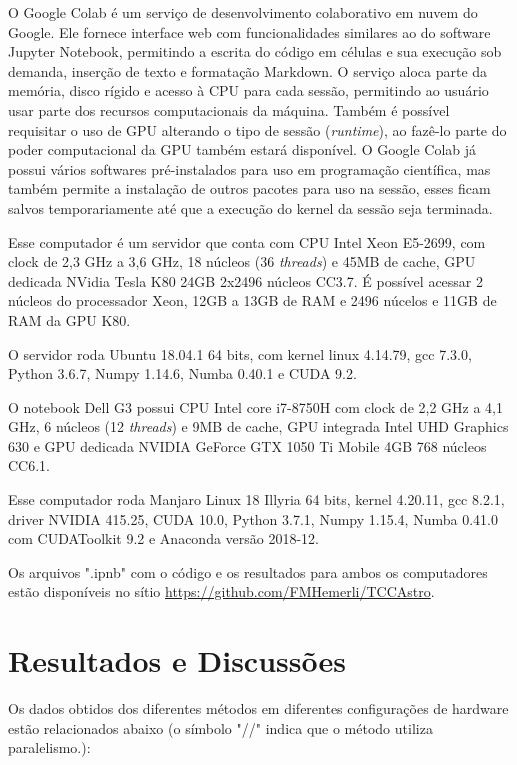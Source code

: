 \documentclass[
	12pt,				%
	a4paper,			%
	english,			%
	openright,				%
	brazil,				%
	oneside]{abntex2}
\begin{document}
	O Google Colab é um serviço de desenvolvimento colaborativo em nuvem do Google. Ele fornece interface web com funcionalidades similares ao do software Jupyter Notebook, permitindo a escrita do código em células e sua execução sob demanda, inserção de texto e formatação Markdown. O serviço aloca parte da memória, disco rígido e acesso à CPU para cada sessão, permitindo ao usuário usar parte dos recursos computacionais da máquina. Também é possível requisitar o uso de GPU alterando o tipo de sessão (\textit{runtime}), ao fazê-lo parte do poder computacional da GPU também estará disponível. O Google Colab já possui vários softwares pré-instalados para uso em programação científica, mas também permite a instalação de outros pacotes para uso na sessão, esses ficam salvos temporariamente até que a execução do kernel da sessão seja terminada.
	
	Esse computador é um servidor que conta com CPU Intel Xeon E5-2699, com clock de 2,3 GHz a 3,6 GHz, 18 núcleos (36 \textit{threads}) e 45MB de cache, GPU dedicada NVidia Tesla K80 24GB 2x2496 núcleos CC3.7. É possível acessar 2 núcleos do processador Xeon, 12GB a 13GB de RAM e 2496 núcelos e 11GB de RAM da GPU K80.
	
	O servidor roda Ubuntu 18.04.1 64 bits, com kernel linux 4.14.79, gcc 7.3.0, Python 3.6.7, Numpy 1.14.6, Numba 0.40.1 e CUDA 9.2.
	
	O notebook Dell G3 possui CPU Intel core i7-8750H com clock de 2,2 GHz a 4,1 GHz, 6 núcleos (12 \textit{threads}) e 9MB de cache, GPU integrada Intel UHD Graphics 630 e GPU dedicada NVIDIA GeForce GTX 1050 Ti Mobile 4GB 768 núcleos CC6.1.
	
	Esse computador roda Manjaro Linux 18 Illyria 64 bits, kernel 4.20.11, gcc 8.2.1, driver NVIDIA 415.25, CUDA 10.0, Python 3.7.1, Numpy 1.15.4, Numba 0.41.0 com CUDAToolkit 9.2 e Anaconda versão 2018-12.
	
	Os arquivos ".ipnb" com o código e os resultados para ambos os computadores estão disponíveis no sítio \url{https://github.com/FMHemerli/TCCAstro}.

\chapter[Resultados e Discussões]{Resultados e Discussões}

Os dados obtidos dos diferentes métodos em diferentes configurações de hardware estão relacionados abaixo (o símbolo "//" indica que o método utiliza paralelismo.):
\end{document}
